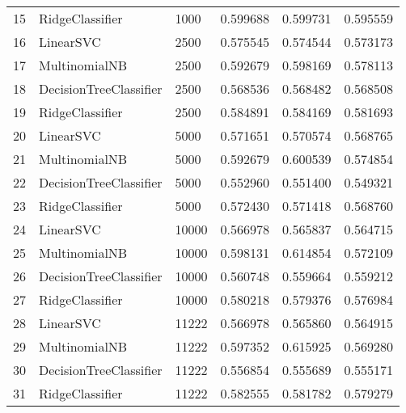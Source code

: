 \begin{tabular}{lllrrr}
15 &         RidgeClassifier &         1000 &  0.599688 &   0.599731 &  0.595559 \\
16 &               LinearSVC &         2500 &  0.575545 &   0.574544 &  0.573173 \\
17 &           MultinomialNB &         2500 &  0.592679 &   0.598169 &  0.578113 \\
18 &  DecisionTreeClassifier &         2500 &  0.568536 &   0.568482 &  0.568508 \\
19 &         RidgeClassifier &         2500 &  0.584891 &   0.584169 &  0.581693 \\
20 &               LinearSVC &         5000 &  0.571651 &   0.570574 &  0.568765 \\
21 &           MultinomialNB &         5000 &  0.592679 &   0.600539 &  0.574854 \\
22 &  DecisionTreeClassifier &         5000 &  0.552960 &   0.551400 &  0.549321 \\
23 &         RidgeClassifier &         5000 &  0.572430 &   0.571418 &  0.568760 \\
24 &               LinearSVC &        10000 &  0.566978 &   0.565837 &  0.564715 \\
25 &           MultinomialNB &        10000 &  0.598131 &   0.614854 &  0.572109 \\
26 &  DecisionTreeClassifier &        10000 &  0.560748 &   0.559664 &  0.559212 \\
27 &         RidgeClassifier &        10000 &  0.580218 &   0.579376 &  0.576984 \\
28 &               LinearSVC &        11222 &  0.566978 &   0.565860 &  0.564915 \\
29 &           MultinomialNB &        11222 &  0.597352 &   0.615925 &  0.569280 \\
30 &  DecisionTreeClassifier &        11222 &  0.556854 &   0.555689 &  0.555171 \\
31 &         RidgeClassifier &        11222 &  0.582555 &   0.581782 &  0.579279 \\
\bottomrule
\end{tabular}

